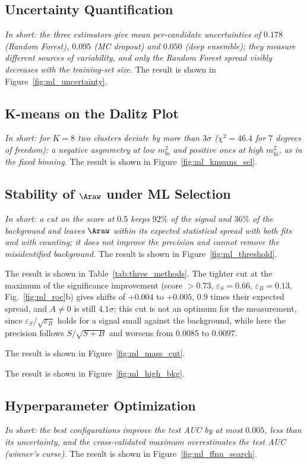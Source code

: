 \subsection{Uncertainty Quantification}
\label{sec:ml_uncertainty}
\emph{In short: the three estimators give mean per-candidate uncertainties of $0.178$ (Random Forest), $0.095$ (MC dropout) and $0.050$ (deep ensemble); they measure different sources of variability, and only the Random Forest spread visibly decreases with the training-set size.}
The result is shown in Figure~\ref{fig:ml_uncertainty}.

\subsection{K-means on the Dalitz Plot}
\label{sec:ml_kmeans}
\emph{In short: for $K=8$ two clusters deviate by more than $3\sigma$ ($\chi^2=46.4$ for $7$ degrees of freedom): a negative asymmetry at low $m^2_{\mathrm{lo}}$ and positive ones at high $m^2_{\mathrm{hi}}$, as in the fixed binning.}
The result is shown in Figure~\ref{fig:ml_kmeans_sel}.

\subsection{Stability of $\Araw$ under ML Selection}
\label{sec:ml_stability}
\emph{In short: a cut on the score at $0.5$ keeps $92\%$ of the signal and $36\%$ of the background and leaves $\Araw$ within its expected statistical spread with both fits and with counting; it does not improve the precision and cannot remove the misidentified background.}
The result is shown in Figure~\ref{fig:ml_threshold}.

The result is shown in Table~\ref{tab:three_methods}. The tighter cut at the maximum of the significance improvement (score $>0.73$, $\varepsilon_S=0.66$, $\varepsilon_B=0.13$, Fig.~\ref{fig:ml_roc}b) gives shifts of $+0.004$ to $+0.005$, $0.9$ times their expected spread, and $A\neq0$ is still $4.1\sigma$; this cut is not an optimum for the measurement, since $\varepsilon_S/\sqrt{\varepsilon_B}$ holds for a signal small against the background, while here the precision follows $S/\sqrt{S+B}$ and worsens from $0.0085$ to $0.0097$.

The result is shown in Figure~\ref{fig:ml_mass_cut}.

The result is shown in Figure~\ref{fig:ml_high_bkg}.

\subsection{Hyperparameter Optimization}
\label{sec:ml_hyper}
\emph{In short: the best configurations improve the test AUC by at most $0.005$, less than its uncertainty, and the cross-validated maximum overestimates the test AUC (winner's curse).}
The result is shown in Figure~\ref{fig:ml_ffnn_search}.

